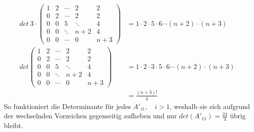 \documentclass{article} %
\begin{document}
\begin{align*}
    det\ 3 \cdot \begin{pmatrix}
    1 & 2 & \cdots & 2 & 2  \\
   0 & 2 & \cdots & 2 & 2 \\
   0 & 0 & 5 & \ddots & 4 \\
   0 & 0 & \ddots & n+2 & 4 \\
   0 & 0 & \cdots & 0 & n+3 
\end{pmatrix} & = 1 \cdot 2 \cdot 5 \cdot 6 \cdots (n+2) \cdot (n+3) \\
   det  \begin{pmatrix}
    1 & 2 & \cdots & 2 & 2  \\
   0 & 2 & \cdots & 2 & 2 \\
   0 & 0 & 5 & \ddots & 4 \\
   0 & 0 & \ddots & n+2 & 4 \\
   0 & 0 & \cdots & 0 & n+3 
\end{pmatrix}   & = 1 \cdot 2  \cdot 3 \cdot 5 \cdot 6 \cdots (n+2) \cdot (n+3) \\
& = \frac{(n+3)!}{4}
\end{align*}
So funktioniert die Determinante für jedes $A'_{i1}, \quad i>1$, weshalb sie sich aufgrund der wechselnden Vorzeichen gegenseitig aufheben und nur $det(A'_{11}) = \frac{24}{4}$ übrig bleibt. 
\end{document}

